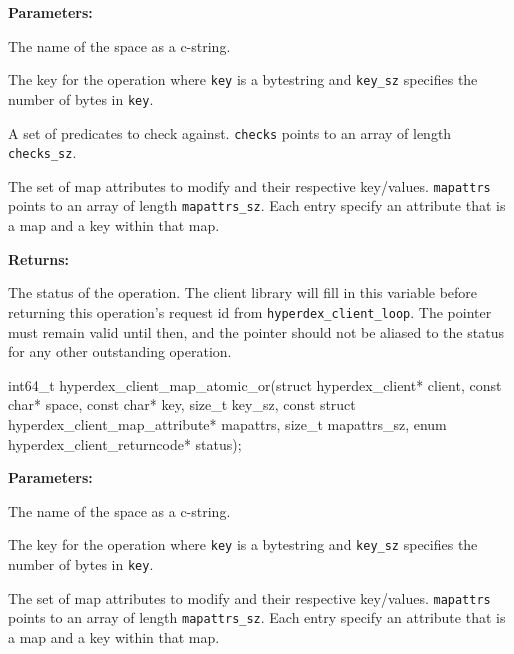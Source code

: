 \noindent\textbf{Parameters:}
\begin{description}[labelindent=\widthof{{\texttt{mapattrs}, \texttt{mapattrs\_sz}}},leftmargin=*,noitemsep,nolistsep,align=right]
\item[\texttt{space}] The name of the space as a c-string.
\item[\texttt{key}, \texttt{key\_sz}] The key for the operation where \texttt{key} is a bytestring and \texttt{key\_sz} specifies the number of bytes in \texttt{key}.
\item[\texttt{checks}, \texttt{checks\_sz}] A set of predicates to check against.  \texttt{checks} points to an array of length \texttt{checks\_sz}.
\item[\texttt{mapattrs}, \texttt{mapattrs\_sz}] The set of map attributes to modify and their respective key/values.  \texttt{mapattrs} points to an array of length \texttt{mapattrs\_sz}.  Each entry specify an attribute that is a map and a key within that map.
\end{description}

\noindent\textbf{Returns:}
\begin{description}[labelindent=\widthof{{\texttt{status}}},leftmargin=*,noitemsep,nolistsep,align=right]
\item[\texttt{status}] The status of the operation.  The client library will fill in this variable before returning this operation's request id from \texttt{hyperdex\_client\_loop}.  The pointer must remain valid until then, and the pointer should not be aliased to the status for any other outstanding operation.
\end{description}

\funcsep
\begin{ccode}
int64_t hyperdex_client_map_atomic_or(struct hyperdex_client* client,
                const char* space,
                const char* key, size_t key_sz,
                const struct hyperdex_client_map_attribute* mapattrs, size_t mapattrs_sz,
                enum hyperdex_client_returncode* status);
\end{ccode}
\funcdesc 

\noindent\textbf{Parameters:}
\begin{description}[labelindent=\widthof{{\texttt{mapattrs}, \texttt{mapattrs\_sz}}},leftmargin=*,noitemsep,nolistsep,align=right]
\item[\texttt{space}] The name of the space as a c-string.
\item[\texttt{key}, \texttt{key\_sz}] The key for the operation where \texttt{key} is a bytestring and \texttt{key\_sz} specifies the number of bytes in \texttt{key}.
\item[\texttt{mapattrs}, \texttt{mapattrs\_sz}] The set of map attributes to modify and their respective key/values.  \texttt{mapattrs} points to an array of length \texttt{mapattrs\_sz}.  Each entry specify an attribute that is a map and a key within that map.
\end{description}

